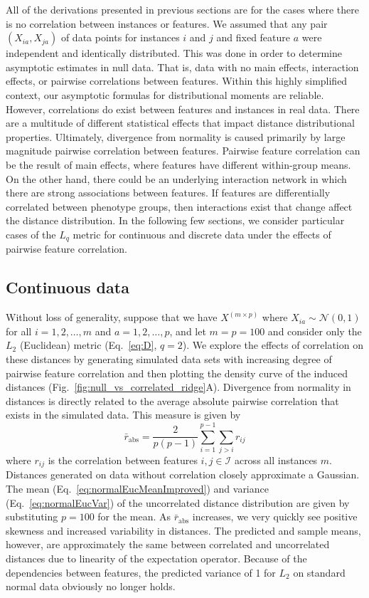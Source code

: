 \documentclass[aoas]{imsart}
\begin{document}
All of the derivations presented in previous sections are for the cases where there is no correlation between instances or features. We assumed that any pair $(X_{ia},X_{ja})$ of data points for instances $i$ and $j$ and fixed feature $a$ were independent and identically distributed. This was done in order to determine asymptotic estimates in null data. That is, data with no main effects, interaction effects, or pairwise correlations between features. Within this highly simplified context, our asymptotic formulas for distributional moments are reliable. However, correlations do exist between features and instances in real data. There are a multitude of different statistical effects that impact distance distributional properties. Ultimately, divergence from normality is caused primarily by large magnitude pairwise correlation between features. Pairwise feature correlation can be the result of main effects, where features have different within-group means. On the other hand, there could be an underlying interaction network in which there are strong associations between features. If features are differentially correlated between phenotype groups, then interactions exist that change affect the distance distribution. In the following few sections, we consider particular cases of the $L_q$ metric for continuous and discrete data under the effects of pairwise feature correlation.

\subsection{Continuous data}

Without loss of generality, suppose that we have $X^{(m \times p)}$ where $X_{ia} \sim \mathcal{N}(0,1)$ for all $i=1,2,\dots,m$ and $a=1,2,\dots,p$, and let $m=p=100$ and consider only the $L_2$ (Euclidean) metric (Eq.~\ref{eq:D}, $q=2$). We explore the effects of correlation on these distances by generating simulated data sets with increasing degree of pairwise feature correlation and then plotting the density curve of the induced distances (Fig.~\ref{fig:null_vs_correlated_ridge}A). Divergence from normality in distances is directly related to the average absolute pairwise correlation that exists in the simulated data. This measure is given by
%
\begin{equation}\label{eq:abs_corr}
\bar{r}_\text{abs} = \frac{2}{p(p-1)}\sum^{p-1}_{i=1} \sum_{j > i} r_{ij}
\end{equation}
%
where $r_{ij}$ is the correlation between features $i,j \in \mathcal{I}$ across all instances $m$. Distances generated on data without correlation closely approximate a Gaussian. The mean (Eq.~\ref{eq:normalEucMeanImproved}) and variance (Eq.~\ref{eq:normalEucVar}) of the uncorrelated distance distribution are given by substituting $p=100$ for the mean. As $\bar{r}_\text{abs}$ increases, we very quickly see positive skewness and increased variability in distances. The predicted and sample means, however, are approximately the same between correlated and uncorrelated distances due to linearity of the expectation operator. Because of the dependencies between features, the predicted variance of 1 for $L_2$ on standard normal data obviously no longer holds. 
\end{document}
